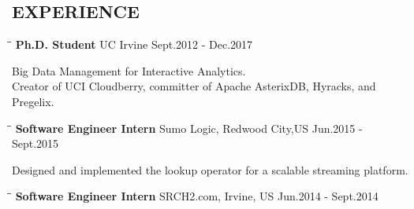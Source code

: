 \documentclass{res}
\begin{document}


\address{\bf jianfeng.jia@gmail.com (949)678-9893 \\ Seeking a Full-time Big Data Software Engineer Position}

\begin{resume}

\section{EXPERIENCE}
   \vspace{-0.1in}
   \begin{tabbing}
   \hspace{2in}\= \hspace{3in}\= \kill %
    {\bf Ph.D. Student} \>UC Irvine  \>Sept.2012 - Dec.2017\\
   \end{tabbing}\vspace{-30pt}      %
   Big Data Management for Interactive Analytics. \\
   Creator of UCI Cloudberry, committer of Apache AsterixDB, Hyracks, and Pregelix.
   \vspace{-0.1in}
   \begin{tabbing}
   \hspace{2in}\= \hspace{3in}\= \kill %
    {\bf Software Engineer Intern} \>Sumo Logic, Redwood City,US \>Jun.2015 - Sept.2015\\
   \end{tabbing}\vspace{-30pt}      %
   Designed and implemented the lookup operator for a scalable streaming platform.
   \vspace{-0.1in}
   \begin{tabbing}
   \hspace{2in}\= \hspace{3in}\= \kill %
    {\bf Software Engineer Intern} \>SRCH2.com, Irvine, US     \>Jun.2014 - Sept.2014\\

\end{tabbing}
\end{resume}
\end{document}
